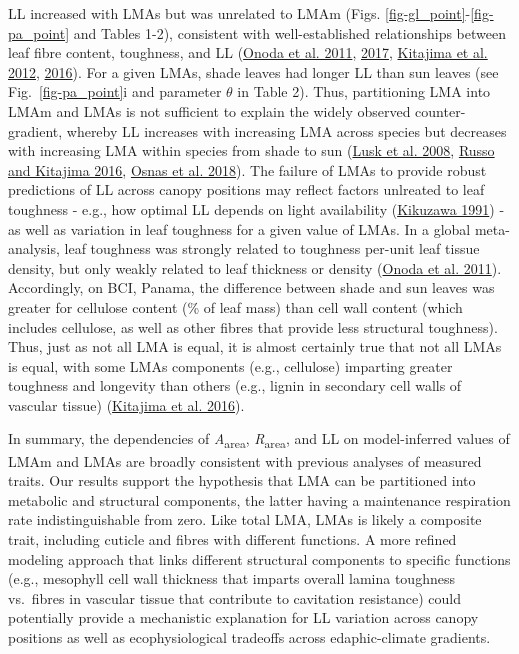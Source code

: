 \documentclass[
  12pt,
  letterpaper,
  DIV=11,
  numbers=noendperiod]{scrartcl}
\begin{document}
LL increased with LMAs but was unrelated to LMAm (Figs.
\ref{fig-gl_point}-\ref{fig-pa_point} and Tables 1-2), consistent with
well-established relationships between leaf fibre content, toughness,
and LL (\protect\hyperlink{ref-Onoda2011}{Onoda et al. 2011},
\protect\hyperlink{ref-Onoda2017}{2017},
\protect\hyperlink{ref-Kitajima2012}{Kitajima et al. 2012},
\protect\hyperlink{ref-Kitajima2016}{2016}). For a given LMAs, shade
leaves had longer LL than sun leaves (see Fig.~\ref{fig-pa_point}i and
parameter \(\theta\) in Table 2). Thus, partitioning LMA into LMAm and
LMAs is not sufficient to explain the widely observed counter-gradient,
whereby LL increases with increasing LMA across species but decreases
with increasing LMA within species from shade to sun
(\protect\hyperlink{ref-Lusk2008}{Lusk et al. 2008},
\protect\hyperlink{ref-Russo2016}{Russo and Kitajima 2016},
\protect\hyperlink{ref-Osnas2018}{Osnas et al. 2018}). The failure of
LMAs to provide robust predictions of LL across canopy positions may
reflect factors unlreated to leaf toughness - e.g., how optimal LL
depends on light availability
(\protect\hyperlink{ref-Kikuzawa1991}{Kikuzawa 1991}) - as well as
variation in leaf toughness for a given value of LMAs. In a global
meta-analysis, leaf toughness was strongly related to toughness per-unit
leaf tissue density, but only weakly related to leaf thickness or
density (\protect\hyperlink{ref-Onoda2011}{Onoda et al. 2011}).
Accordingly, on BCI, Panama, the difference between shade and sun leaves
was greater for cellulose content (\% of leaf mass) than cell wall
content (which includes cellulose, as well as other fibres that provide
less structural toughness). Thus, just as not all LMA is equal, it is
almost certainly true that not all LMAs is equal, with some LMAs
components (e.g., cellulose) imparting greater toughness and longevity
than others (e.g., lignin in secondary cell walls of vascular tissue)
(\protect\hyperlink{ref-Kitajima2016}{Kitajima et al. 2016}).

In summary, the dependencies of \emph{A}\textsubscript{area},
\emph{R}\textsubscript{area}, and LL on model-inferred values of LMAm
and LMAs are broadly consistent with previous analyses of measured
traits. Our results support the hypothesis that LMA can be partitioned
into metabolic and structural components, the latter having a
maintenance respiration rate indistinguishable from zero. Like total
LMA, LMAs is likely a composite trait, including cuticle and fibres with
different functions. A more refined modeling approach that links
different structural components to specific functions (e.g., mesophyll
cell wall thickness that imparts overall lamina toughness vs.~fibres in
vascular tissue that contribute to cavitation resistance) could
potentially provide a mechanistic explanation for LL variation across
canopy positions as well as ecophysiological tradeoffs across
edaphic-climate gradients.
\end{document}
